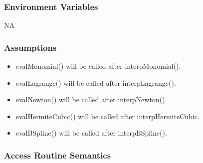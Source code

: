 \documentclass[12pt, titlepage]{article}
\begin{document}
\subsubsection{Environment Variables}

NA

\subsubsection{Assumptions}

\begin{itemize}
	\item evalMonomial() will be called after interpMonomial().
	\item evalLagrange() will be called after interpLagrange().
	\item evalNewton() will be called after interpNewton().
	\item evalHermiteCubic() will be called after interpHermiteCubic.
	\item evalBSpline() will be called after interpBSpline().
\end{itemize}

\subsubsection{Access Routine Semantics}
\end{document}
